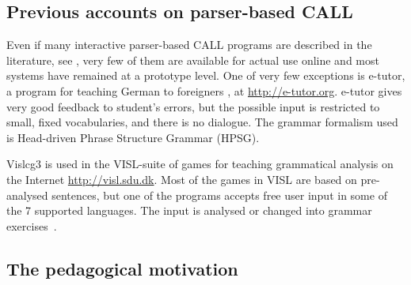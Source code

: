 \documentclass[11pt]{article}
\begin{document}
\subsection{Previous accounts on parser-based CALL}

Even if many interactive parser-based CALL programs are described in the literature, see \cite{Gamper:02,Heift:07}, very few of them are available for actual use online and most systems have remained at a prototype level. One of very few exceptions is e-tutor, a program for teaching German to foreigners \cite{Heift:01,Heift:02}, at \url{http://e-tutor.org}. e-tutor gives very good feedback to student's errors, but the possible input is restricted to small, fixed vocabularies, and there is no dialogue. The grammar formalism used is Head-driven Phrase Structure Grammar (HPSG).

Vislcg3 is used in the VISL-suite of games for teaching grammatical analysis on the Internet \url{http://visl.sdu.dk}. Most of the games in VISL are based on pre-analysed sentences, but one of the programs accepts free user input in some of the 7 supported languages. The input is analysed or changed into grammar exercises~\cite{Bick:05}.


\subsection{The pedagogical motivation} \label{pedidea}
\end{document}
